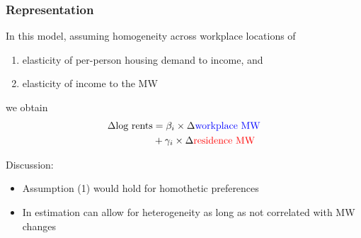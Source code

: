 \documentclass[aspectratio=169, t]{beamer}
\begin{document}
\begin{frame}
\begin{columns}
\begin{column}{0.65\textwidth}
\begin{figure}
                
            \end{figure}
        \end{column}
    \end{columns}

\end{frame}

\begin{frame}
    \frametitle{Representation}

    In this model, assuming homogeneity across workplace locations of
    \begin{enumerate}
        \item elasticity of per-person housing demand to income, and
        \item elasticity of income to the MW
    \end{enumerate}
    we obtain
    \[
    \begin{split}
        \Delta \text{log rents} & = \beta_i  \times \Delta {\color{blue}  \text{workplace MW}} \\
                                & + \gamma_i \times \Delta {\color{red} \text{residence MW}} \\
    \end{split}
    \]

    \vspace{3mm}
    \pause
    Discussion:
    \begin{itemize}
        \item Assumption (1) would hold for homothetic preferences
        \item In estimation can allow for heterogeneity as long as not correlated with MW changes
    \end{itemize}

\end{frame}
\end{document}
